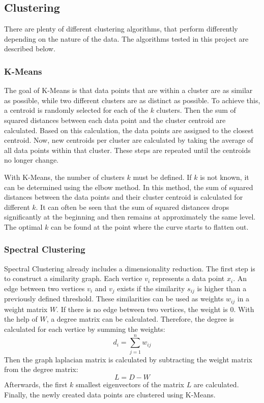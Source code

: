 \subsection{Clustering}
\label{clustering_methods}

There are plenty of different clustering algorithms, that perform differently depending on the nature of the data.
The algorithms tested in this project are described below.

\subsubsection{K-Means}
The goal of K-Means is that data points that are within a cluster are as similar as possible, while two different clusters are as distinct as possible.
To achieve this, a centroid is randomly selected for each of the $k$ clusters.
Then the sum of squared distances between each data point and the cluster centroid are calculated.
Based on this calculation, the data points are assigned to the closest centroid.
Now, new centroids per cluster are calculated by taking the average of all data points within that cluster.
These steps are repeated until the centroids no longer change.\cite{kmeans}

With K-Means, the number of clusters $k$ must be defined. If $k$ is not known, it can be determined using the elbow method.
In this method, the sum of squared distances between the data points and their cluster centroid is calculated for different $k$.
It can often be seen that the sum of squared distances drops significantly at the beginning and then remains at approximately the same level.
The optimal $k$ can be found at the point where the curve starts to flatten out.\cite{kmeans}

\subsubsection{Spectral Clustering}
Spectral Clustering already includes a dimensionality reduction.
The first step is to construct a similarity graph.
Each vertice $v_i$ represents a data point $x_i$.
An edge between two vertices $v_i$ and $v_j$ exists if the similarity $s_{ij}$ is higher than a previously defined threshold.
These similarities can be used as weights $w_{ij}$ in a weight matrix $W$.
If there is no edge between two vertices, the weight is $0$.
With the help of $W$, a degree matrix can be calculated.
Therefore, the degree is calculated for each vertice by summing the weights:
$$
d_i = \sum_{j=1}^n{w_{ij}}
$$
Then the graph laplacian matrix is calculated by subtracting the weight matrix from the degree matrix:
$$
L = D - W
$$
Afterwards, the first $k$ smallest eigenvectors of the matrix $L$ are calculated.
Finally, the newly created data points are clustered using K-Means.\cite{spectral_clustering}

